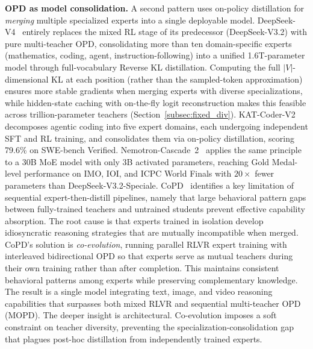 \documentclass{article} %
\begin{document}
\textbf{OPD as model consolidation.} A second pattern uses on-policy distillation for \emph{merging} multiple specialized experts into a single deployable model. DeepSeek-V4~\citep{deepseekv4} entirely replaces the mixed RL stage of its predecessor (DeepSeek-V3.2) with pure multi-teacher OPD, consolidating more than ten domain-specific experts (mathematics, coding, agent, instruction-following) into a unified 1.6T-parameter model through full-vocabulary Reverse KL distillation. Computing the full $|V|$-dimensional KL at each position (rather than the sampled-token approximation) ensures more stable gradients when merging experts with diverse specializations, while hidden-state caching with on-the-fly logit reconstruction makes this feasible across trillion-parameter teachers (Section~\ref{subsec:fixed_div}). KAT-Coder-V2~\citep{li2026katcoderv2} decomposes agentic coding into five expert domains, each undergoing independent SFT and RL training, and consolidates them via on-policy distillation, scoring 79.6\% on SWE-bench Verified. Nemotron-Cascade~2~\citep{2603.19220} applies the same principle to a 30B MoE model with only 3B activated parameters, reaching Gold Medal-level performance on IMO, IOI, and ICPC World Finals with $20\times$ fewer parameters than DeepSeek-V3.2-Speciale. CoPD~\citep{gu2026copd} identifies a key limitation of sequential expert-then-distill pipelines, namely that large behavioral pattern gaps between fully-trained teachers and untrained students prevent effective capability absorption. The root cause is that experts trained in isolation develop idiosyncratic reasoning strategies that are mutually incompatible when merged. CoPD's solution is \emph{co-evolution}, running parallel RLVR expert training with interleaved bidirectional OPD so that experts serve as mutual teachers during their own training rather than after completion. This maintains consistent behavioral patterns among experts while preserving complementary knowledge. The result is a single model integrating text, image, and video reasoning capabilities that surpasses both mixed RLVR and sequential multi-teacher OPD (MOPD). The deeper insight is architectural. Co-evolution imposes a soft constraint on teacher diversity, preventing the specialization-consolidation gap that plagues post-hoc distillation from independently trained experts.
\end{document}
